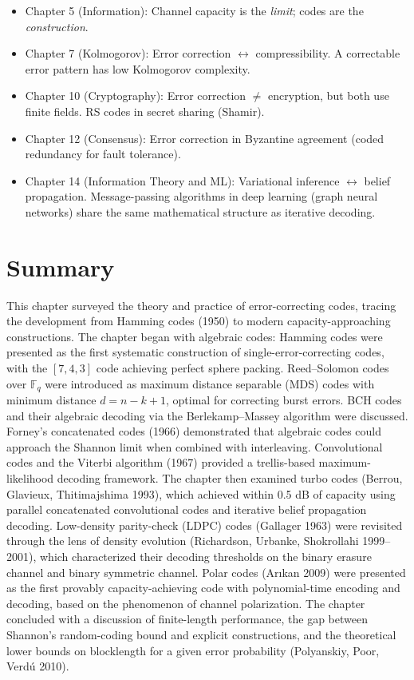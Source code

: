 \begin{itemize}
\item Chapter 5 (Information): Channel capacity is the \emph{limit}; codes are the \emph{construction}.
\item Chapter 7 (Kolmogorov): Error correction $\leftrightarrow$ compressibility. A correctable error pattern has low Kolmogorov complexity.
\item Chapter 10 (Cryptography): Error correction $\neq$ encryption, but both use finite fields. RS codes in secret sharing (Shamir).
\item Chapter 12 (Consensus): Error correction in Byzantine agreement (coded redundancy for fault tolerance).
\item Chapter 14 (Information Theory and ML): Variational inference $\leftrightarrow$ belief propagation. Message-passing algorithms in deep learning (graph neural networks) share the same mathematical structure as iterative decoding.
\end{itemize}

\section{Summary}
\label{sec:ec:summary}

This chapter surveyed the theory and practice of error-correcting codes, tracing the development from Hamming codes (1950) to modern capacity-approaching constructions. The chapter began with algebraic codes: Hamming codes were presented as the first systematic construction of single-error-correcting codes, with the $[7,4,3]$ code achieving perfect sphere packing. Reed--Solomon codes over $\mathbb{F}_q$ were introduced as maximum distance separable (MDS) codes with minimum distance $d = n-k+1$, optimal for correcting burst errors. BCH codes and their algebraic decoding via the Berlekamp--Massey algorithm were discussed. Forney's concatenated codes (1966) demonstrated that algebraic codes could approach the Shannon limit when combined with interleaving. Convolutional codes and the Viterbi algorithm (1967) provided a trellis-based maximum-likelihood decoding framework. The chapter then examined turbo codes (Berrou, Glavieux, Thitimajshima 1993), which achieved within 0.5 dB of capacity using parallel concatenated convolutional codes and iterative belief propagation decoding. Low-density parity-check (LDPC) codes (Gallager 1963) were revisited through the lens of density evolution (Richardson, Urbanke, Shokrollahi 1999--2001), which characterized their decoding thresholds on the binary erasure channel and binary symmetric channel. Polar codes (Arıkan 2009) were presented as the first provably capacity-achieving code with polynomial-time encoding and decoding, based on the phenomenon of channel polarization. The chapter concluded with a discussion of finite-length performance, the gap between Shannon's random-coding bound and explicit constructions, and the theoretical lower bounds on blocklength for a given error probability (Polyanskiy, Poor, Verdú 2010).

